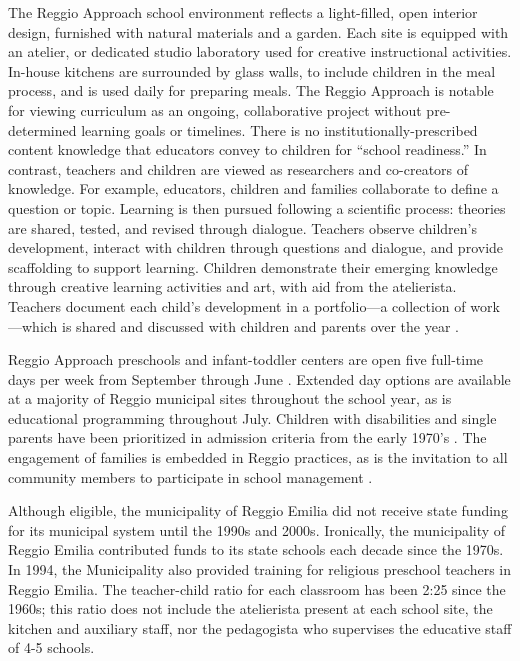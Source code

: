 The Reggio Approach school environment reflects a light-filled, open interior design, furnished with natural materials and a garden. Each site is equipped with an atelier, or dedicated studio laboratory used for creative instructional activities. In-house kitchens are surrounded by glass walls, to include children in the meal process, and is used daily for preparing meals. The Reggio Approach is notable for viewing curriculum as an ongoing, collaborative project without pre-determined learning goals or timelines. There is no institutionally-prescribed content knowledge that educators convey to children for ``school readiness.'' In contrast, teachers and children are viewed as researchers and co-creators of knowledge. For example, educators, children and families collaborate to define a question or topic. Learning is then pursued following a scientific process: theories are shared, tested, and revised through dialogue. Teachers observe children's development, interact with children through questions and dialogue, and provide scaffolding to support learning. Children demonstrate their emerging knowledge through creative learning activities and art, with aid from the atelierista. Teachers document each child's development in a portfolio---a collection of work---which is shared and discussed with children and parents over the year \citep{Rinaldi_2006_ReggioEmilia_BOOK,Giudici-Nicolosi_2014_Reggio-Approach}. 

Reggio Approach preschools and infant-toddler centers are open five full-time days per week from September through June \citep{Giudici-Nicolosi_2014_Reggio-Approach}. Extended day options are available at a majority of Reggio municipal sites throughout the school year, as is educational programming throughout July. Children with disabilities and single parents have been prioritized in admission criteria from the early 1970's \citep{Edwards-etal-eds_1998_Hundred-Languages}. The engagement of families is embedded in Reggio practices, as is the invitation to all community members to participate in school management \citep{CEHD_2016_Historical-Analysis,Cagliari-etal-eds_2016_BOOK_Loris-Malaguzzi}. 

Although eligible, the municipality of Reggio Emilia did not receive state funding for its municipal system until the 1990s and 2000s. Ironically, the municipality of Reggio Emilia contributed funds to its state schools each decade since the 1970s. In 1994, the Municipality also provided training for religious preschool teachers in Reggio Emilia.  The teacher-child ratio for each classroom has been 2:25 since the 1960s; this ratio does not include the atelierista present at each school site, the kitchen and auxiliary staff, nor the pedagogista who supervises the educative staff of 4-5 schools. 
										
